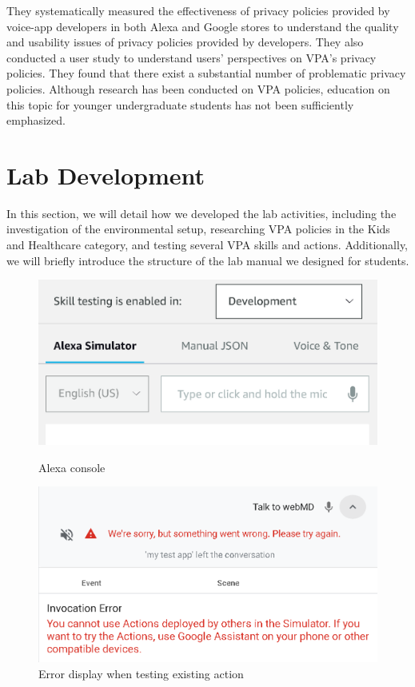 \documentclass{article}
\begin{document}
They systematically measured the effectiveness of privacy policies provided by voice-app developers in both Alexa and Google stores to understand the quality and usability issues of privacy policies provided by developers. They also conducted a user study to understand users’ perspectives on VPA’s privacy policies. They found that there exist a substantial number of problematic privacy policies. Although research has been conducted on VPA policies, education on this topic for younger undergraduate students has not been sufficiently emphasized.

\section{Lab Development} \label{Lab Development}
In this section, we will detail how we developed the lab activities, including the investigation of the environmental setup, researching VPA policies in the Kids and Healthcare category, and testing several VPA skills and actions. Additionally, we will briefly introduce the structure of the lab manual we designed for students.

\begin{figure}[tbp!]
\begin{minipage}[t]{0.45\linewidth}
\centering
\includegraphics[width=\linewidth]{9014_1.png}
\caption{Alexa console}\label{Images/alexa console.png}
\end{minipage}
\begin{minipage}[t]{0.45\linewidth}
\centering
\includegraphics[width=\linewidth]{9014_2.png}
\caption{Error display when testing existing action}\label{Images/google action error.png}
\end{minipage}
\end{figure}
\end{document}
